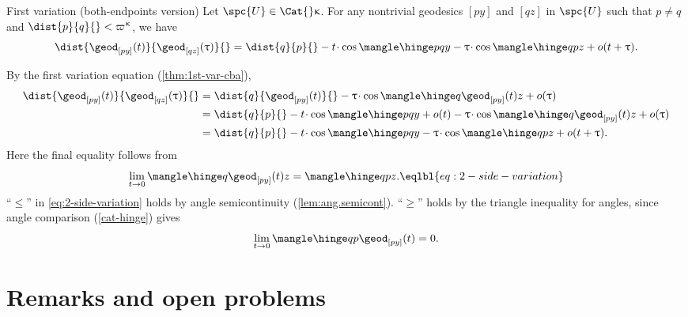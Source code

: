 \begin{thm} {First variation (both-endpoints version)}\label{cor:both-end-first-var-cba}
Let  $\spc{U}\in \Cat{}\kappa$.
For any nontrivial geodesics $[py]$ and $[qz]$ in $\spc{U}$  such that $p\ne q$ and $\dist{p}{q}{}<\varpi\kappa$, we have 
\[
\dist{\geod_{[p y]}(t)}{\geod_{[q z]}(\tau)}{}
=
\dist{q}{p}{} - t\cdot\cos\mangle\hinge p q y - \tau\cdot\cos\mangle\hinge q p z+o(t+\tau).
\]
\end{thm}

By the first variation equation (\ref{thm:1st-var-cba}),
\[\begin{aligned}
\dist{\geod_{[p y]}(t)}{\geod_{[q z]}(\tau)}{} &=
\dist{q}{\geod_{[p y]}(t)}{} - \tau\cdot\cos\mangle\hinge q  {\geod_{[p y]}(t)} z +o(\tau)\\
&=\dist{q}{p}{} - t\cdot\cos\mangle\hinge p q y + o(t) -  \tau\cdot\cos\mangle\hinge q  {\geod_{[p y]}(t)} z +o(\tau)\\
&= \dist{q}{p}{} - t\cdot\cos\mangle\hinge p q y -  \tau\cdot\cos\mangle\hinge q  p z +o(t+\tau).
\end{aligned}
\]
Here the final equality follows from   
\[
\lim_{t\to 0}\mangle\hinge q  {\geod_{[p y]}(t)} z = \mangle\hinge q  p z.
\eqlbl{eq:2-side-variation}
\]
``$\le$'' in \ref{eq:2-side-variation}  holds by angle semicontinuity (\ref{lem:ang.semicont}). ``$\ge$'' holds by the triangle inequality for angles, since angle comparison (\ref{cat-hinge}) gives 
\[
\lim_{t\to 0}\mangle\hinge q p  {\geod_{[p y]}(t)} = 0.
\]
\qeds



%

%

\section{Remarks and open problems}



